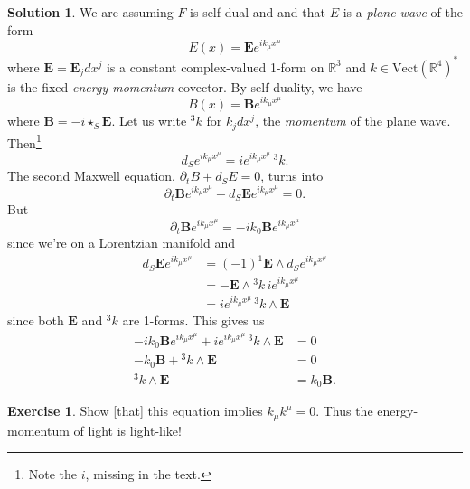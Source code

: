\documentclass[11pt, a4paper]{report}
\theoremstyle{definition}
\newtheorem{ex}{Exercise}[part]
\newtheorem{sol}{Solution}[part]
\begin{document}
\begin{sol}

We are assuming $F$ is self-dual and and that $E$ is a \emph{plane wave} of the form
\[
    E(x) = \mathbf{E} e^{i k_\mu x^\mu}
\]
where $\mathbf{E} = \mathbf{E}_j dx^j$ is a constant complex-valued 1-form on $\mathbb{R}^3$
and $k \in {\text{Vect}(\mathbb{R}^4)}^*$ is the fixed \emph{energy-momentum} covector.
By self-duality, we have
\[
    B(x) = \mathbf{B} e^{i k_\mu x^\mu}
\]
where $\mathbf{B} = -i \star_S \mathbf{E}$.
Let us write $^3 k$ for $k_j dx^j$, the \emph{momentum} of the plane wave.
Then\footnote{Note the $i$, missing in the text.}
\[
    d_S e^{i k_\mu x^\mu} = ie^{i k_\mu x^\mu} \, ^3 k.
\]
The second Maxwell equation, $\partial_t B + d_S E = 0$, turns into
\[
    \partial_t \mathbf{B} e^{i k_\mu x^\mu} + d_S \mathbf{E} e^{i k_\mu x^\mu} = 0.
\]
But
\[
    \partial_t \mathbf{B} e^{i k_\mu x^\mu} = -ik_0 \mathbf{B} e^{i k_\mu x^\mu}
\]
since we're on a Lorentzian manifold and
\begin{align*}
    d_S \mathbf{E} e^{i k_\mu x^\mu} &= {(-1)}^1 \mathbf{E} \wedge d_S e^{i k_\mu x^\mu} \\
        &= -\mathbf{E} \wedge {}^3 k \, i e^{i k_\mu x^\mu} \\
        &= i e^{i k_\mu x^\mu} \, ^3 k \wedge \mathbf{E}
\end{align*}
since both $\mathbf{E}$ and $^3 k$ are 1-forms.
This gives us
\begin{align*}
    -ik_0 \mathbf{B} e^{i k_\mu x^\mu} + i e^{i k_\mu x^\mu} \, ^3 k \wedge \mathbf{E} &= 0 \\
    -k_0 \mathbf{B} + {}^3 k \wedge \mathbf{E} &= 0 \\
    ^3 k \wedge \mathbf{E} &= k_0 \mathbf{B}.
\end{align*}

\end{sol}

\begin{ex}

Show [that] this equation implies $k_\mu k^\mu = 0$. Thus the energy-momentum of light is light-like!

\end{ex}
\end{document}
